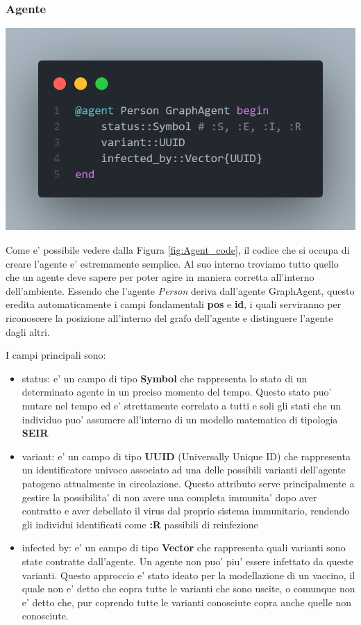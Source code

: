 \subsubsection*{Agente}
\begin{minipage}{\linewidth}
    \centering
    \includegraphics[width=\textwidth]{img/agent_code.png}
    \label{fig:Agent_code}
\end{minipage}

Come e' possibile vedere dalla Figura \ref{fig:Agent_code}, il codice che si occupa
di creare l'agente e' estremamente semplice. Al suo interno troviamo tutto quello che 
un agente deve sapere per poter agire in maniera corretta all'interno dell'ambiente. 
Essendo che l'agente \emph{Person} deriva dall'agente GraphAgent, questo eredita 
automaticamente i campi fondamentali \textbf{pos} e \textbf{id}, i quali serviranno 
per riconoscere la posizione all'interno del grafo dell'agente e distinguere l'agente 
dagli altri.

I campi principali sono:
\begin{itemize}
	\item status: e' un campo di tipo \textbf{Symbol} che rappresenta 
	lo stato di un determinato agente in un preciso momento del tempo. 
	Questo stato puo' mutare nel tempo ed e' strettamente correlato a 
	tutti e soli gli stati che un individuo puo' assumere all'interno di
	un modello matematico di tipologia \textbf{SEIR}
	\item variant:  e' un campo di tipo \textbf{UUID} (Universally Unique ID)
	che rappresenta un identificatore univoco associato ad una delle possibili
	varianti dell'agente patogeno attualmente in circolazione. Questo attributo 
	serve principalmente a gestire la possibilita' di non avere una completa
	immunita' dopo aver contratto e aver debellato il virus dal proprio sistema 
	immunitario, rendendo gli individui identificati come \textbf{:R} 
	passibili di reinfezione
	\item infected by: e' un campo di tipo \textbf{Vector} che rappresenta 
	quali varianti sono state contratte dall'agente. Un agente non puo' piu'
	essere infettato da queste varianti. Questo approccio e' stato ideato per 
	la modellazione di un vaccino, il quale non e' detto che copra tutte le
	varianti che sono uscite, o comunque non e' detto che, pur coprendo tutte le
	varianti conosciute copra anche quelle non conosciute.
\end{itemize}

